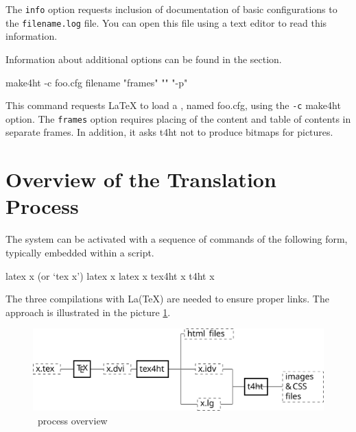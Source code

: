The \texttt{info} option requests inclusion of documentation of basic configurations to the \texttt{filename.log} file.
You can open this file using a text editor to read this information.

Information about additional options can be found in the  section.


\begin{shellcommand}
make4ht -c foo.cfg filename "frames" "" "-p"
\end{shellcommand}

This command requests LaTeX to load a , named
foo.cfg, using the \texttt{-c} make4ht option. The \texttt{frames} option
requires placing of the content and table of contents in separate frames. In
addition, it asks t4ht not to produce bitmaps for pictures. 



\section{Overview of the Translation Process}\label{sec:overview}



The system can be activated with a sequence of commands of the following form, typically embedded within a script.

\begin{shellcommand}
latex      x            (or ‘tex x’) 
latex      x 
latex      x 
tex4ht     x 
t4ht       x 
\end{shellcommand}

The three compilations with La(TeX) are needed to ensure proper links. The approach is illustrated in the picture \ref{fig:process}. 

\begin{figure}
  \includegraphics[width=\textwidth]{images/tex4ht_process/tex4ht_process}
  \caption{\texfourht\ process overview}
  \label{fig:process}
\end{figure}


